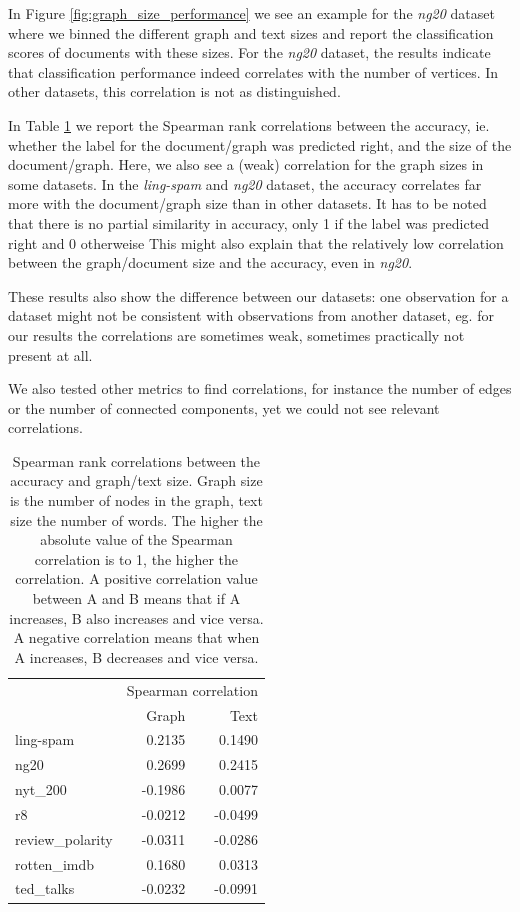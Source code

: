 In Figure \ref{fig:graph_size_performance} we see an example for the \textit{ng20} dataset where we binned the different graph and text sizes and report the classification scores of documents with these sizes.
For the \textit{ng20} dataset, the results indicate that classification performance indeed correlates with the number of vertices.
In other datasets, this correlation is not as distinguished.
\fi

In Table \ref{table:correlations_size} we report the Spearman rank correlations \cite{Hauke2011} between the accuracy, ie. whether the label for the document/graph was predicted right, and the size of the document/graph.
Here, we also see a (weak) correlation for the graph sizes in some datasets.
In the \textit{ling-spam} and \textit{ng20} dataset, the accuracy correlates far more with the document/graph size than in other datasets.
It has to be noted that there is no partial similarity in accuracy, only 1 if the label was predicted right and 0 otherweise
This might also explain that the relatively low correlation between the graph/document size and the accuracy, even in \textit{ng20}.

These results also show the difference between our datasets: one observation for a dataset might not be consistent with observations from another dataset, eg. for our results the correlations are sometimes weak, sometimes practically not present at all.

We also tested other metrics to find correlations, for instance the number of edges or the number of connected components, yet we could not see relevant correlations.

\begin{table}[htb!]
	\centering
	\begin{tabular}{lrr}
		&  \multicolumn{2}{c}{Spearman correlation} \\
		&  Graph &  Text \\
		\midrule
		ling-spam       &  0.2135 &  0.1490 \\
		ng20            &  0.2699 &  0.2415 \\
		nyt\_200         & -0.1986 &  0.0077 \\
		r8              & -0.0212 & -0.0499 \\
		review\_polarity & -0.0311 & -0.0286 \\
		rotten\_imdb     &  0.1680 &  0.0313 \\
		ted\_talks       & -0.0232 & -0.0991 \\
		\bottomrule
	\end{tabular}
	\caption[Table: Graph/text size correlations]{Spearman rank correlations between the accuracy and graph/text size. Graph size is the number of nodes in the graph, text size the number of words. The higher the absolute value of the Spearman correlation is to 1, the higher the correlation.
	A positive correlation value between A and B means that if A increases, B also increases and vice versa.
	A negative correlation means that when A increases, B decreases and vice versa.}%
	\label{table:correlations_size}
\end{table}

